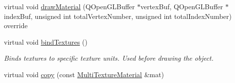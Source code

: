 \begin{DoxyCompactItemize}
\item 
virtual void \mbox{\hyperlink{class_geometry_engine_1_1_geometry_material_1_1_multi_texture_material_af6edaa5960d07b6abee870760e869189}{draw\+Material}} (Q\+Open\+G\+L\+Buffer $\ast$vertex\+Buf, Q\+Open\+G\+L\+Buffer $\ast$index\+Buf, unsigned int total\+Vertex\+Number, unsigned int total\+Index\+Number) override
\item 
\mbox{\label{class_geometry_engine_1_1_geometry_material_1_1_multi_texture_material_a084e546d070abd90983f33414642219b}} 
virtual void \mbox{\hyperlink{class_geometry_engine_1_1_geometry_material_1_1_multi_texture_material_a084e546d070abd90983f33414642219b}{bind\+Textures}} ()
\begin{DoxyCompactList}\small\item\em Binds textures to specific texture units. Used before drawing the object. \end{DoxyCompactList}\item 
virtual void \mbox{\hyperlink{class_geometry_engine_1_1_geometry_material_1_1_multi_texture_material_add208366ae882ad1bd9c6029969902b4}{copy}} (const \mbox{\hyperlink{class_geometry_engine_1_1_geometry_material_1_1_multi_texture_material}{Multi\+Texture\+Material}} \&mat)
\end{DoxyCompactItemize}
